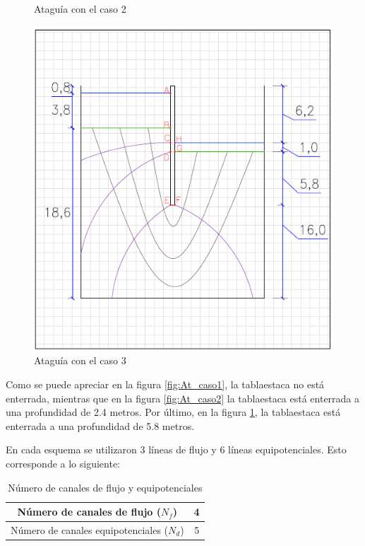 \documentclass{article}
\begin{document}
\begin{figure}[h]
\begin{minipage}{0.32\textwidth}
        \caption{Ataguía con el caso 2}
        \label{fig:At_caso2}
    \end{minipage}
    \hfill
    \begin{minipage}{0.32\textwidth}
        \centering
        \includegraphics[width=\textwidth]{graficos/At_caso3.png}
        \caption{Ataguía con el caso 3}
        \label{fig:At_caso3}
    \end{minipage}
\end{figure}

Como se puede apreciar en la figura \ref{fig:At_caso1}, la tablaestaca no está enterrada, mientras que en la figura \ref{fig:At_caso2} la tablaestaca está enterrada a una profundidad de 2.4 metros. Por último, en la figura \ref{fig:At_caso3}, la tablaestaca está enterrada a una profundidad de 5.8 metros.

En cada esquema se utilizaron 3 líneas de flujo y 6 líneas equipotenciales. Esto corresponde a lo siguiente:

\begin{table}[h!]
  \centering
  \begin{tabular}{|c|c|}
    \hline
    Número de canales de flujo ($N_f$)& 4 \\ \hline
    Número de canales equipotenciales ($N_d$) & 5 \\ \hline
  \end{tabular}
  \caption{Número de canales de flujo y equipotenciales}
\end{table}
\end{document}
